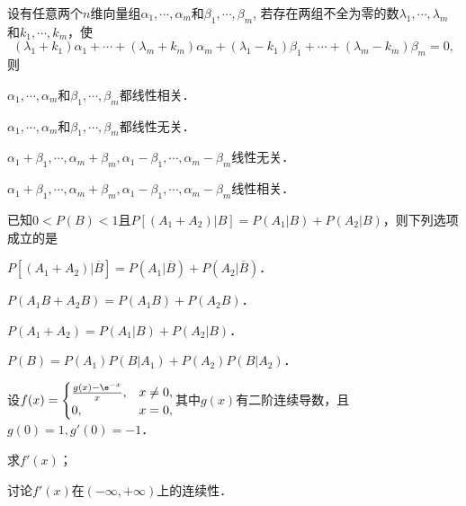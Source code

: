 \documentclass[plain,noanswer,medmath]{../../template/jnuexam}
\begin{document}
\begin{problem}
设有任意两个$n$维向量组$\alpha_1, \cdots ,\alpha_m$和$\beta_1, \cdots ,\beta_m$,
若存在两组不全为零的数$\lambda_1, \cdots ,\lambda_m$和$k_1, \cdots ,k_m$，使
$$(\lambda_1 + k_1)\alpha_1 + \cdots + (\lambda_m + k_m)\alpha_m + (\lambda_1 - k_1)\beta_1
   + \cdots + (\lambda_m - k_m)\beta_m = 0,$$
则\pickout{}
\begin{abcd}
\item $\alpha_1, \cdots ,\alpha_m$和$\beta_1, \cdots ,\beta_m$都线性相关．
\item $\alpha_1, \cdots ,\alpha_m$和$\beta_1, \cdots ,\beta_m$都线性无关．
\item $\alpha_1+\beta_1, \cdots, \alpha_m+\beta_m, \alpha_1-\beta_1, \cdots, \alpha_m-\beta_m$线性无关．
\item $\alpha_1+\beta_1, \cdots, \alpha_m+\beta_m, \alpha_1-\beta_1, \cdots, \alpha_m-\beta_m$线性相关．
\end{abcd}
\end{problem}


\begin{problem}
已知$0 < P(B) < 1$且$P[(A_1 + A_2)|B] = P(A_1|B) + P(A_2|B)$，则下列选项成立的是\pickout{}
\begin{abcd}
\item $P[(A_1 + A_2)|\overline{B}] = P(A_1|\overline{B}) + P(A_2|\overline{B})$．
\item $P(A_1 B + A_2 B) = P(A_1 B) + P(A_2 B)$．
\item $P(A_1 + A_2) = P(A_1|B) + P(A_2|B)$．
\item $P(B) = P(A_1)P(B|A_1) + P(A_2)P(B|A_2)$．
\end{abcd}
\end{problem}



\begin{problem}
设$f(x) = \begin{cases}
  \frac{g(x) - \e^{- x}}{x}, & x \ne 0, \\
                          0, & x = 0,
\end{cases}$其中$g(x)$有二阶连续导数，且$g(0) = 1,g'(0) = - 1$．\par
\begin{enumerate*}
\item 求$f'(x)$；
\item 讨论$f'(x)$在$(-\infty , +\infty)$上的连续性．
\end{enumerate*}
\end{problem}
\end{document}
